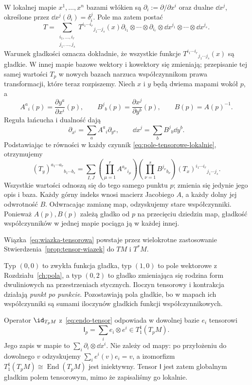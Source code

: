 W lokalnej mapie $x^1,\ldots,x^n$ bazami włókien są
$\partial_i:=\partial/\partial x^i$ oraz dualne
$\dd x^j$, określone przez $\dd x^j(\partial_i)=\delta_i^j$.
Pole ma zatem postać
\begin{equation}\label{eq:pole-tensorowe-lokalnie}
 T=\sum_{\substack{i_1,\ldots,i_r\\j_1,\ldots,j_s}}
 T^{i_1\cdots i_r}{}_{j_1\cdots j_s}(x)
 \partial_{i_1}\otimes\cdots\otimes\partial_{i_r}
 \otimes\dd x^{j_1}\otimes\cdots\otimes\dd x^{j_s}.
\end{equation}
Warunek gładkości oznacza dokładnie, że wszystkie funkcje
$T^{i_1\cdots i_r}{}_{j_1\cdots j_s}(x)$ są gładkie.
W innej mapie bazowe wektory i kowektory się zmieniają;
przepisanie tej samej wartości $T_p$ w nowych bazach
narzuca współczynnikom prawa transformacji, które teraz rozpiszemy.
Niech $x$ i $y$ będą dwiema mapami wokół $p$, a
\[
 A^a{}_i(p)=\frac{\partial y^a}{\partial x^i}(p),\qquad
 B^j{}_b(p)=\frac{\partial x^j}{\partial y^b}(p),\qquad B(p)=A(p)^{-1}.
\]
Reguła łańcucha i dualność dają
\[
 \partial_{x^i}=\sum_a A^a{}_i\partial_{y^a},\qquad
 \dd x^j=\sum_b B^j{}_b\dd y^b.
\]
Podstawiając te równości w każdy czynnik
\eqref{eq:pole-tensorowe-lokalnie}, otrzymujemy
\begin{equation}\label{eq:tensor-zmiana-wspolrzednych}
 (T_y)^{a_1\cdots a_r}{}_{b_1\cdots b_s}
 =\sum_{I,J}
 \left(\prod_{\mu=1}^r A^{a_\mu}{}_{i_\mu}\right)
 \left(\prod_{\nu=1}^s B^{j_\nu}{}_{b_\nu}\right)
 (T_x)^{i_1\cdots i_r}{}_{j_1\cdots j_s}.
\end{equation}
Wszystkie wartości odnoszą się do tego samego punktu $p$;
zmienia się jedynie jego opis i baza. Każdy górny indeks wnosi
macierz Jacobiego $A$, a każdy dolny jej odwrotność $B$.
Odwracając zamianę map, odzyskujemy stare współczynniki.
Ponieważ $A(p),B(p)$ zależą gładko od $p$ na przecięciu
dziedzin map, gładkość współczynników w jednej
mapie pociąga ją w każdej innej.

Wiązka~\eqref{eq:wiazka-tensorowa} powstaje
przez wielokrotne zastosowanie
Stwierdzenia~\ref{prop:tensor-wiazek} do $TM$ i $T^*M$.

Typ $(0,0)$ to zwykła funkcja gładka, typ $(1,0)$ to
pole wektorowe z Rozdziału~\ref{ch:pola}, a typ $(0,2)$
to gładko zmieniająca się rodzina form dwuliniowych
na przestrzeniach stycznych. Iloczyn tensorowy i kontrakcja
działają \emph{punkt po punkcie}. Pozostawiają pola gładkie,
bo w mapach ich współczynniki są sumami iloczynów
gładkich funkcji współczynnikowych.

\begin{przyklad}
Operator $\id_{T_pM}$ z~\eqref{eq:endo-tensor} odpowiada
w dowolnej bazie $e_i$ tensorowi
\[
 \mathsf I_p=\sum_i e_i\otimes e^i\in T^1_1(T_pM).
\]
Jego zapis w mapie to $\sum_i\partial_i\otimes\dd x^i$.
Nie zależy od mapy: po przyłożeniu do dowolnego $v$
odzyskujemy $\sum_i e^i(v)e_i=v$, a izomorfizm
$T^1_1(T_pM)\cong\operatorname{End}(T_pM)$ jest
iniektywny. Tensor $\mathsf I$ jest zatem globalnym
gładkim polem tensorowym, mimo że zapisaliśmy go lokalnie.
\end{przyklad}

